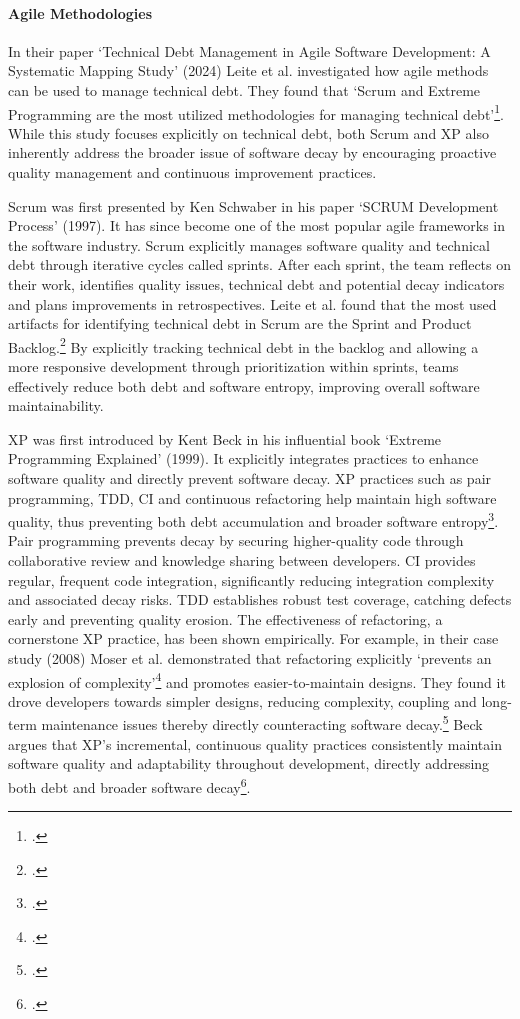 \paragraph{Agile Methodologies}
In their paper `Technical Debt Management in Agile Software Development: A Systematic Mapping Study' (2024) Leite et al.
investigated how agile methods can be used to manage technical debt. They found that `Scrum and Extreme Programming are the most utilized methodologies 
for managing technical debt'\footcite[318]{leiteTechnicalDebtManagement2024}. While this study focuses explicitly on technical debt, both Scrum and \ac{XP}
also inherently address the broader issue of software decay by encouraging proactive quality management and continuous improvement practices.

Scrum was first presented by Ken Schwaber in his paper `SCRUM Development Process' (1997). 
It has since become one of the most popular agile frameworks in the software industry. Scrum explicitly manages software quality and technical debt through iterative cycles called sprints.
After each sprint, the team reflects on their work, identifies quality issues, technical debt and potential decay indicators and plans improvements in
retrospectives. Leite et al. found that the most used artifacts for identifying technical debt in Scrum are the Sprint and Product Backlog.\footcite[315]{leiteTechnicalDebtManagement2024}
By explicitly tracking technical debt in the backlog and allowing a more responsive development through prioritization within sprints, teams effectively reduce both debt and software entropy, improving overall software maintainability.

\ac{XP} was first introduced by Kent Beck in his influential book `Extreme Programming Explained' (1999).
It explicitly integrates practices to enhance software quality and directly prevent software decay.
\ac{XP} practices such as pair programming, \ac{TDD}, \ac{CI} and continuous refactoring help maintain high software quality, thus preventing both debt accumulation
and broader software entropy\footcite[5-6]{beckExtremeProgrammingExplained1999}.
Pair programming prevents decay by securing higher-quality code through collaborative review and knowledge sharing between developers.
\ac{CI} provides regular, frequent code integration, significantly reducing integration complexity and associated decay risks.
\ac{TDD} establishes robust test coverage, catching defects early and preventing quality erosion.
The effectiveness of refactoring, a cornerstone XP practice, has been shown empirically. For example, in their case study (2008) Moser et al.
demonstrated that refactoring explicitly `prevents an explosion of complexity'\footcite[262]{moserCaseStudyImpact2008}
and promotes easier-to-maintain designs.
They found it drove developers towards simpler designs, reducing complexity, coupling and long-term maintenance issues thereby directly counteracting software decay.\footcite[262]{moserCaseStudyImpact2008}
Beck argues that \ac{XP}'s incremental, continuous quality practices consistently maintain software quality and adaptability throughout development, directly addressing both debt and broader software decay\footcite[5-7]{beckExtremeProgrammingExplained1999}.

